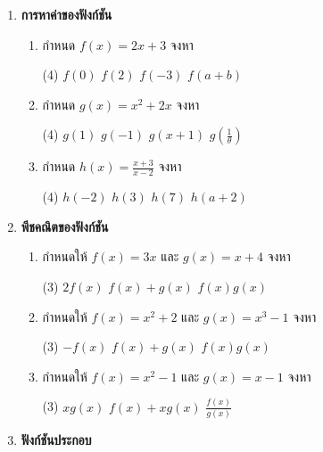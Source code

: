 \begin{enumerate}
\item \textbf{การหาค่าของฟังก์ชัน} 

\begin{enumerate}
\item กำหนด $f(x) = 2x+3$ จงหา
\begin{tasks}(4)
\task $f(0)$
\vspace{30pt}
\task $f(2)$
\task $f(-3)$
\task $f(a+b)$
\end{tasks}
\item กำหนด $g(x) = x^2+2x$ จงหา
\begin{tasks}(4)
\task $g(1)$
\vspace{30pt}
\task $g(-1)$
\task $g(x+1)$
\task $g\left(\frac{1}{\theta}\right)$
\end{tasks}
\item กำหนด $h(x) = \frac{x+3}{x-2}$ จงหา
\begin{tasks}(4)
\task $h(-2)$
\vspace{30pt}
\task $h(3)$
\task $h(7)$
\task $h(a+2)$
\end{tasks}
\end{enumerate}

\item \textbf{พีชคณิตของฟังก์ชัน} 

\begin{enumerate}
\item กำหนดให้ $f(x) = 3x$ และ $g(x) = x+4$ จงหา
\begin{tasks}(3)
\task $2f(x)$
\vspace{50pt}
\task $f(x) + g(x)$
\task $f(x)g(x)$
\end{tasks}
\item กำหนดให้ $f(x) = x^2+2$ และ $g(x) = x^3-1$ จงหา
\begin{tasks}(3)
\task $-f(x)$
\vspace{50pt}
\task $f(x)+g(x)$
\task $f(x)g(x)$
\end{tasks}
\item กำหนดให้ $f(x) = x^2-1$ และ $g(x) = x-1$ จงหา
\begin{tasks}(3)
\task $xg(x)$
\vspace{50pt}
\task $f(x) + xg(x)$
\task $\frac{f(x)}{g(x)}$
\end{tasks}
\end{enumerate}

\item \textbf{ฟังก์ชันประกอบ} 


\end{enumerate}
